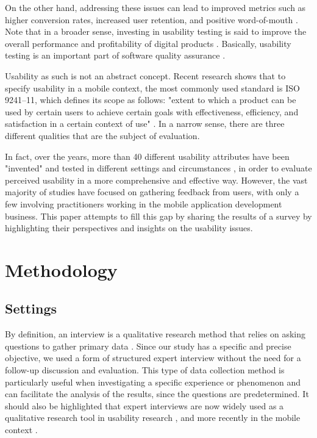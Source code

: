 \documentclass[preprint,12pt,number]{elsarticle}
\begin{document}
On the other hand, addressing these issues can lead to improved metrics such as higher conversion rates, increased user retention, and positive word-of-mouth \citep{rajaobelina2021relationship}. 
Note that in a broader sense, investing in usability testing is said to improve the overall performance and profitability of digital products \citep{byun2020evaluation, gatsou2013exploring}. Basically, usability testing is an important part of software quality assurance \citep{dhillon2022applied}.

Usability as such is not an abstract concept. Recent research \citep{weichbroth2020usability} shows that to specify usability in a mobile context, the most commonly used standard is ISO 9241--11, which defines its scope as follows: "extent to which a product can be used by certain users to achieve certain goals with effectiveness, efficiency, and satisfaction in a certain context of use" \citep{ISO9242-11}. In a narrow sense, there are three different qualities that are the subject of evaluation.

In fact, over the years, more than 40 different usability attributes have been "invented" and tested in different settings and circumstances \citep{weichbroth2020usability}, in order to evaluate perceived usability in a more comprehensive and effective way. However, the vast majority of studies have focused on gathering feedback from users, with only a few involving practitioners working in the mobile application development business. This paper attempts to fill this gap by sharing the results of a survey by highlighting their perspectives and insights on the usability issues. 

\section{Methodology}
\label{sec:methodology}

\subsection{Settings}
By definition, an interview is a qualitative research method that relies on asking questions to gather primary data \citep{alshenqeeti2014interviewing}.
Since our study has a specific and precise objective, we used a form of structured expert interview without the need for a follow-up discussion and evaluation. This type of data collection method is particularly useful when investigating a specific experience or phenomenon and can facilitate the analysis of the results, since the questions are predetermined. 
It should also be highlighted that expert interviews are now widely used as a qualitative research tool in usability research \citep{hirai2007evaluation, van2017barriers}, and more recently in the mobile context \citep{jeong2020gui, wich2015enhanced}. 
\end{document}
